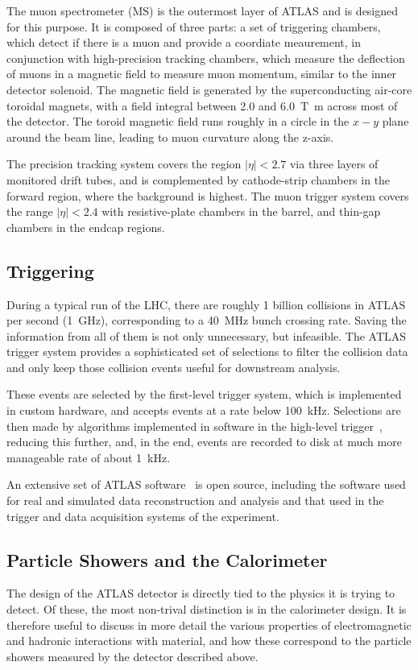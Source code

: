 The muon spectrometer (MS) is the outermost layer of ATLAS and is designed for this purpose. It is composed 
of three parts: a set of triggering chambers, which detect if there is a muon and provide 
a coordiate meaurement, in conjunction with high-precision tracking chambers, which measure the deflection of 
muons in a magnetic field to measure muon momentum, similar to the inner detector solenoid. The magnetic 
field is generated by the superconducting air-core toroidal magnets, with a field integral between 
\num{2.0} and \SI{6.0}{\tesla\metre} across most of the detector. The toroid magnetic field runs roughly 
in a circle in the $x-y$ plane around the beam line, leading to muon curvature along the z-axis.

The precision tracking system covers the region \(|\eta| < 2.7\) via three layers of monitored drift 
tubes, and is complemented by cathode-strip chambers in the forward region, where the background is highest.
The muon trigger system covers the range \(|\eta| < 2.4\) with resistive-plate chambers in the barrel, and thin-gap chambers in the endcap regions.

\subsection{Triggering}
During a typical run of the LHC, there are roughly 1 billion collisions in ATLAS per second (\SI{1}{\GHz}), corresponding
to a \SI{40}{\MHz} bunch crossing rate. 
Saving the information from all of them is not only unnecessary, but infeasible. The ATLAS trigger 
system provides a sophisticated set of selections to filter the collision data and only keep those 
collision events useful for downstream analysis.

These events are selected by the first-level trigger system, which is implemented in custom hardware,
and accepts events at a rate below \SI{100}{\kHz}. Selections are then made by algorithms implemented in software 
in the high-level trigger~\cite{TRIG-2016-01}, reducing this further, and, in the end, events 
are recorded to disk at much more manageable rate of about \SI{1}{\kHz}.

An extensive set of ATLAS software~\cite{ATL-SOFT-PUB-2021-001} is open source, including the software used for real and simulated data reconstruction and analysis and that used in the trigger and data acquisition systems of the experiment.

\subsection{Particle Showers and the Calorimeter}
The design of the ATLAS detector is directly tied to the physics it is trying to detect. Of these, 
the most non-trival distinction is in the calorimeter design. It is therefore useful to discuss in more 
detail the various properties of electromagnetic and 
hadronic interactions with material, and how these correspond to the particle showers measured 
by the detector described above. 

